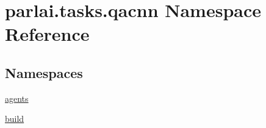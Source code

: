 \hypertarget{namespaceparlai_1_1tasks_1_1qacnn}{}\section{parlai.\+tasks.\+qacnn Namespace Reference}
\label{namespaceparlai_1_1tasks_1_1qacnn}
\subsection*{Namespaces}
\begin{DoxyCompactItemize}
\item 
 \hyperlink{namespaceparlai_1_1tasks_1_1qacnn_1_1agents}{agents}
\item 
 \hyperlink{namespaceparlai_1_1tasks_1_1qacnn_1_1build}{build}
\end{DoxyCompactItemize}
